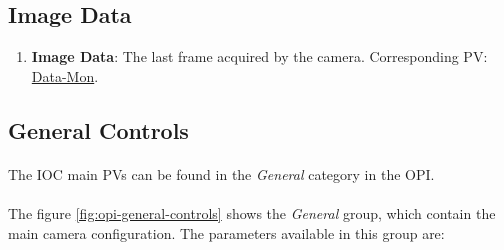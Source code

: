 \documentclass[openany]{article}
\begin{document}
    \subsection{Image Data}\label{sec:image-data}

        \begin{enumerate}
            \item \textbf{Image Data}: The last frame acquired by the camera.
                            Corresponding PV: \hyperlink{pv:data-mon}{Data-Mon}.
        \end{enumerate}

    \subsection{General Controls}\label{sec:general-controls}

        \paragraph{} The IOC main PVs can be found in the \emph{General} category in                             the OPI.


        \paragraph{} The figure \ref{fig:opi-general-controls} shows the 
                             \emph{General} group, which contain the main camera 
                             configuration. The parameters available in this group are: 
\end{document}
